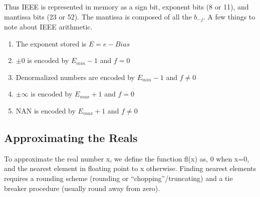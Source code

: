 Thus IEEE is represented in memory as a sign bit, exponent bits (8 or 11), and mantissa bits (23 or 52).  The mantissa is composed of all the $b_{-j}$.  A few things to note about IEEE arithmetic.
\begin{enumerate}
\item The exponent stored is $E=e-Bias$
\item $\pm 0$ is encoded by $E_{min}-1$ and $f=0$
\item Denormalized numbers are encoded by $E_{min}-1$ and $f\ne 0$
\item $\pm\infty$ is encoded by $E_{max}+1$ and $f=0$
\item NAN is encoded by $E_{max}+1$ and $f\ne 0$
\end{enumerate}

\subsection{Approximating the Reals}
To approximate the real number x, we define the function fl(x) as, 0 when x=0, and the nearest element in floating point to x otherwise.  Finding nearest elements requires a rounding scheme (rounding or ``chopping''/truncating) and a tie breaker procedure (usually round away from zero).

